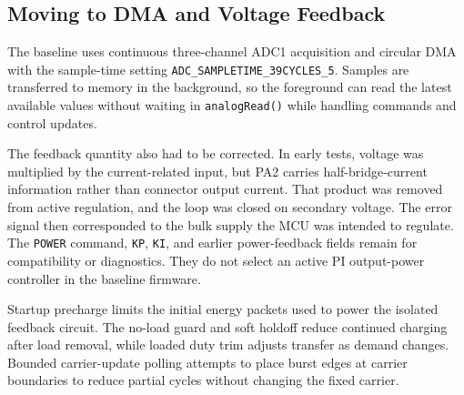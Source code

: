 \subsection{Moving to DMA and Voltage Feedback}
\label{sec:ctrl-v2}

The baseline uses continuous three-channel ADC1 acquisition and circular DMA with the sample-time setting \texttt{ADC\_SAMPLETIME\_39CYCLES\_5}. Samples are transferred to memory in the background, so the foreground can read the latest available values without waiting in \texttt{analogRead()} while handling commands and control updates.

The feedback quantity also had to be corrected. In early tests, voltage was multiplied by the current-related input, but PA2 carries half-bridge-current information rather than connector output current. That product was removed from active regulation, and the loop was closed on secondary voltage. The error signal then corresponded to the bulk supply the MCU was intended to regulate. The \texttt{POWER} command, \texttt{KP}, \texttt{KI}, and earlier power-feedback fields remain for compatibility or diagnostics. They do not select an active PI output-power controller in the baseline firmware.

Startup precharge limits the initial energy packets used to power the isolated feedback circuit. The no-load guard and soft holdoff reduce continued charging after load removal, while loaded duty trim adjusts transfer as demand changes. Bounded carrier-update polling attempts to place burst edges at carrier boundaries to reduce partial cycles without changing the fixed carrier.
